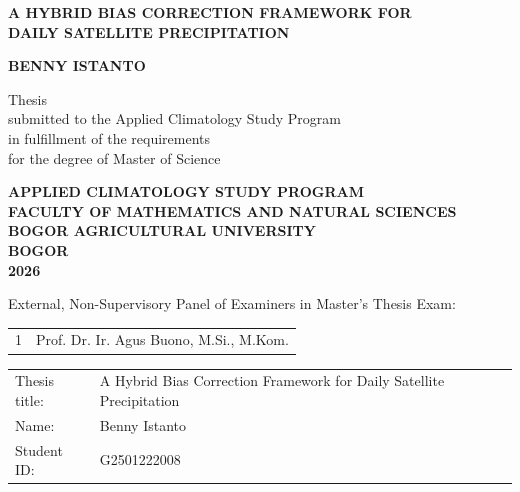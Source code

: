 \thispagestyle{empty}\null\clearpage

\thispagestyle{empty}
\vspace*{1cm}   %
\begin{center}
  {\fontsize{14}{17}\selectfont\bfseries
   A HYBRID BIAS CORRECTION FRAMEWORK FOR\\
   DAILY SATELLITE PRECIPITATION\par}
  \vfill
  {\fontsize{14}{17}\selectfont\bfseries BENNY ISTANTO\par}
  \vfill
  \begin{minipage}{0.75\textwidth}\centering
  Thesis\\
  submitted to the Applied Climatology Study Program\\
  in fulfillment of the requirements\\
  for the degree of Master of Science
  \end{minipage}
  \vfill
  {\fontsize{14}{17}\selectfont\bfseries
   APPLIED CLIMATOLOGY STUDY PROGRAM\\
   FACULTY OF MATHEMATICS AND NATURAL SCIENCES\\
   BOGOR AGRICULTURAL UNIVERSITY\\
   BOGOR\\
   2026\par}
\end{center}
\clearpage

\clearpage
\thispagestyle{empty}
\vspace*{\fill}
\noindent External, Non-Supervisory Panel of Examiners in Master's
Thesis Exam:

\medskip
\noindent
\begin{tabular}{@{}p{0.6cm}l@{}}
1 & Prof. Dr. Ir. Agus Buono, M.Si., M.Kom. \\[\baselineskip]
\end{tabular}
\clearpage

\clearpage
\thispagestyle{empty}
\newlength{\ppkiapprovallabel}
\settowidth{\ppkiapprovallabel}{Student ID:~~}
\noindent
\begin{tabular}{@{}p{\ppkiapprovallabel}@{}p{\dimexpr\textwidth-\ppkiapprovallabel\relax}@{}}
Thesis title: & A Hybrid Bias Correction Framework for Daily Satellite Precipitation \\
Name:         & Benny Istanto \\
Student ID:   & G2501222008 \\
\end{tabular}

